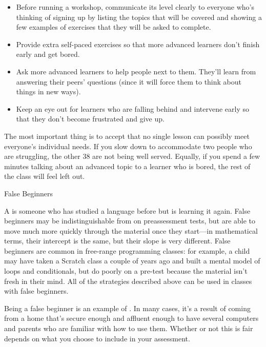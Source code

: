 \begin{itemize}

  \item
    Before running a workshop, communicate its level clearly to
    everyone who's thinking of signing up by listing the topics that
    will be covered and showing a few examples of exercises that they
    will be asked to complete.

  \item
    Provide extra self-paced exercises so that more advanced learners
    don't finish early and get bored.

  \item
    Ask more advanced learners to help people next to them. They'll
    learn from answering their peers' questions (since it will force
    them to think about things in new ways).

  \item
    Keep an eye out for learners who are falling behind and intervene
    early so that they don't become frustrated and give up.

\end{itemize}

The most important thing is to accept that no single lesson can
possibly meet everyone's individual needs. If you slow down to
accommodate two people who are struggling, the other 38 are not being
well served.  Equally, if you spend a few minutes talking about an
advanced topic to a learner who is bored, the rest of the class will
feel left out.

\begin{callout}{False Beginners}

  A  is someone who has
  studied a language before but is learning it again.  False beginners
  may be indistinguishable from
   on preassessment
  tests, but are able to move much more quickly through the material
  once they start---in mathematical terms, their intercept is the
  same, but their slope is very different.  False beginners are common
  in free-range programming classes: for example, a child may have
  taken a Scratch class a couple of years ago and built a mental model
  of loops and conditionals, but do poorly on a pre-test because the
  material isn't fresh in their mind.  All of the strategies described
  above can be used in classes with false beginners.

  Being a false beginner is an example of
  \cite{Marg2010}.  In many cases, it's a result of coming from a home
  that's secure enough and affluent enough to have several computers
  and parents who are familiar with how to use them.  Whether or not
  this is fair depends on what you choose to include in your
  assessment.
  
\end{callout}

